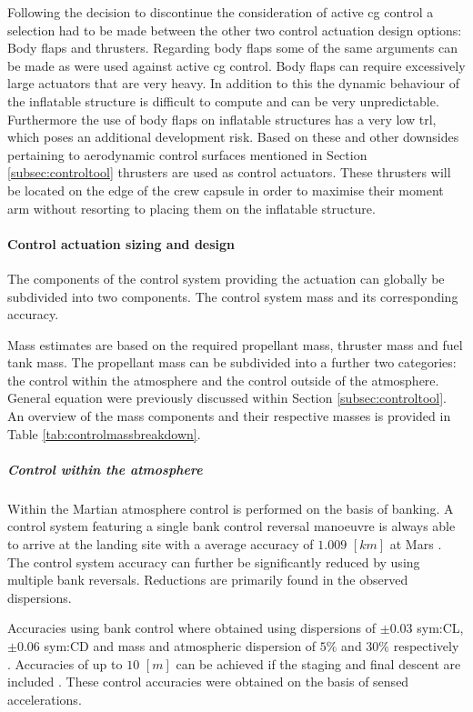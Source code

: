 Following the decision to discontinue the consideration of active \gls{cg} control a selection had to be made between the other two control actuation design options: Body flaps and thrusters. Regarding body flaps some of the same arguments can be made as were used against active \gls{cg} control. Body flaps can require excessively large actuators that are very heavy. In addition to this the dynamic behaviour of the inflatable structure is difficult to compute and can be very unpredictable. Furthermore the use of body flaps on inflatable structures has a very low \gls{trl}, which poses an additional development risk. Based on these and other downsides pertaining to aerodynamic control surfaces mentioned in Section \ref{subsec:controltool} thrusters are used as control actuators. These thrusters will be located on the edge of the crew capsule in order to maximise their moment arm without resorting to placing them on the inflatable structure.

\paragraph{Control actuation sizing and design}
The components of the control system providing the actuation can globally be subdivided into two components. The control system mass and its corresponding accuracy.

Mass estimates are based on the required propellant mass, thruster mass and fuel tank mass. The propellant mass can be subdivided into a further two categories: the control within the atmosphere and the control outside of the atmosphere. General equation were previously discussed within Section \ref{subsec:controltool}. An overview of the mass components and their respective masses is provided in Table \ref{tab:controlmassbreakdown}.

\subparagraph{Control within the atmosphere} 
Within the Martian atmosphere control is performed on the basis of banking. A control system featuring a single bank control reversal manoeuvre is always able to arrive at the landing site with a average accuracy of $1.009$ $[km]$ at Mars \cite{Lu2007}. The control system accuracy can further be significantly reduced by using multiple bank reversals. Reductions are primarily found in the observed dispersions.

Accuracies using bank control where obtained using dispersions of $\pm 0.03 $ \gls{sym:CL}, $\pm 0.06 $ \gls{sym:CD} and mass and atmospheric dispersion of $5\%$ and $30\%$ respectively \cite{Lu2007}. Accuracies of up to $10$ $[m]$ can be achieved if the staging and final descent are included \cite{Davis2010}. These control accuracies were obtained on the basis of sensed accelerations.

